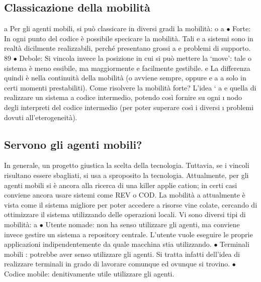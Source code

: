 \subsection{Classicazione della mobilità}
a
Per gli agenti mobili, si può classicare in diversi gradi la mobilità:
o
a
$\bullet$ Forte: In ogni punto del codice è possibile specicare la mobilità. Tali
e
a
sistemi sono in realtà dicilmente realizzabili, perché presentano grossi
a
e
problemi di supporto.
89
$\bullet$ Debole: Si vincola invece la posizione in cui si può mettere la {`}move': tale
o
sistema è meno essibile, ma maggiormente e facilmente gestibile.
e
La differenza quindi è nella continuità della mobilità (o avviene sempre, oppure
e
a
a
solo in certi momenti prestabiliti). Come risolvere la mobilità forte? L'idea `
a
e
quella di realizzare un sistema a codice intermedio, potendo così fornire su ogni
\i{}
nodo degli interpreti del codice intermedio (per poter superare così i diversi
\i{}
problemi dovuti all'eterogeneità).
\subsection{Servono gli agenti mobili?}
In generale, un progetto giustica la scelta della tecnologia. Tuttavia, se i vincoli
risultano essere sbagliati, si usa a sproposito la tecnologia.
Attualmente, per gli agenti mobili si è ancora alla ricerca di una killer applie
cation; in certi casi conviene ancora usare sistemi come REV o COD. La mobilità
a
attualmente è vista come il sistema migliore per poter accedere a risorse vine
colate, cercando di ottimizzare il sistema utilizzando delle operazioni locali. Vi
sono diversi tipi di mobilità:
a
$\bullet$ Utente nomade: non ha senso utilizzare gli agenti, ma conviene invece
gestire un sistema a repository centrale. L'utente vuole eseguire le proprie
applicazioni indipendentemente da quale macchina stia utilizzando.
$\bullet$ Terminali mobili : potrebbe aver senso utilizzare gli agenti. Si tratta infatti
dell'idea di realizzare terminali in grado di lavorare comunque ed ovunque
si trovino.
$\bullet$ Codice mobile: denitivamente utile utilizzare gli agenti.
